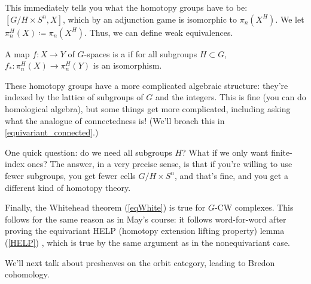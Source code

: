 This immediately tells you what the homotopy groups have to be: $[G/H\times S^n, X]$, which by an adjunction game
is isomorphic to $\pi_n(X^H)$. We let $\pi_n^H(X)\coloneqq \pi_n(X^H)$. Thus, we can define weak equivalences.
\begin{defn}
A map $f\colon X\to Y$ of $G$-spaces is a  if for all subgroups $H\subset G$,
$f_*\colon\pi_n^H(X)\to\pi_n^H(Y)$ is an isomorphism.
\end{defn}
These homotopy groups have a more complicated algebraic structure: they're indexed by the lattice of subgroups of
$G$ and the integers. This is fine (you can do homological algebra), but some things get more complicated,
including asking what the analogue of connectedness is! (We'll broach this in \cref{equivariant_connected}.)

One quick question: do we need all subgroups $H$? What if we only want finite-index ones? The answer, in a very
precise sense, is that if you're willing to use fewer subgroups, you get fewer cells $G/H\times S^n$, and that's
fine, and you get a different kind of homotopy theory.

Finally, the Whitehead theorem (\cref{eqWhite}) is true for $G$-CW complexes. This follows for the same reason as
in May's course: it follows word-for-word after proving the equivariant HELP (homotopy extension lifting property)
lemma (\cref{HELP}) , which is true by the same argument as in the nonequivariant case.

We'll next talk about presheaves on the orbit category, leading to Bredon cohomology.
